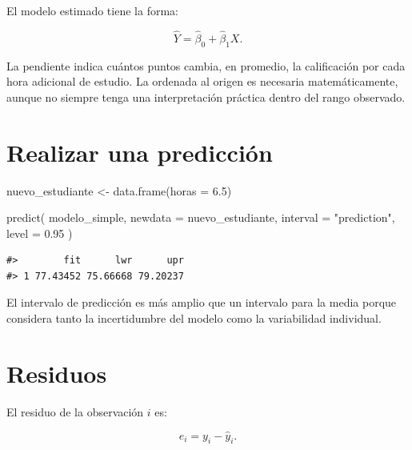 \documentclass[
  spanish,
  10.5pt,
  letterpaper,
  openany,
  headings=big]{scrbook}
\newenvironment{Shaded}{}{}
\newcommand{\AttributeTok}[1]{\textcolor[rgb]{0.84,0.23,0.29}{#1}}
\newcommand{\FloatTok}[1]{\textcolor[rgb]{0.00,0.36,0.77}{#1}}
\newcommand{\FunctionTok}[1]{\textcolor[rgb]{0.44,0.26,0.76}{#1}}
\newcommand{\NormalTok}[1]{\textcolor[rgb]{0.14,0.16,0.18}{#1}}
\newcommand{\OtherTok}[1]{\textcolor[rgb]{0.44,0.26,0.76}{#1}}
\newcommand{\SpecialCharTok}[1]{\textcolor[rgb]{0.00,0.36,0.77}{#1}}
\newcommand{\StringTok}[1]{\textcolor[rgb]{0.01,0.18,0.38}{#1}}
\begin{document}
El modelo estimado tiene la forma:

\[
\widehat{Y} = \widehat{\beta}_0 + \widehat{\beta}_1 X.
\]

La pendiente indica cuántos puntos cambia, en promedio, la calificación
por cada hora adicional de estudio. La ordenada al origen es necesaria
matemáticamente, aunque no siempre tenga una interpretación práctica
dentro del rango observado.

\section{Realizar una predicción}\label{realizar-una-predicciuxf3n}

\begin{Shaded}
\begin{Highlighting}[]
\NormalTok{nuevo\_estudiante }\OtherTok{\textless{}{-}} \FunctionTok{data.frame}\NormalTok{(}\AttributeTok{horas =} \FloatTok{6.5}\NormalTok{)}

\FunctionTok{predict}\NormalTok{(}
\NormalTok{  modelo\_simple,}
  \AttributeTok{newdata =}\NormalTok{ nuevo\_estudiante,}
  \AttributeTok{interval =} \StringTok{"prediction"}\NormalTok{,}
  \AttributeTok{level =} \FloatTok{0.95}
\NormalTok{)}
\end{Highlighting}
\end{Shaded}

\begin{verbatim}
#>        fit      lwr      upr
#> 1 77.43452 75.66668 79.20237
\end{verbatim}

El intervalo de predicción es más amplio que un intervalo para la media
porque considera tanto la incertidumbre del modelo como la variabilidad
individual.

\section{Residuos}\label{residuos}

El residuo de la observación \(i\) es:

\[
e_i = y_i - \widehat{y}_i.
\]

\begin{Shaded}
\end{Shaded}
\end{document}
